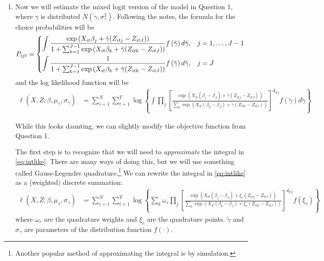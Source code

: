 \documentclass[12pt,english]{article}
\begin{document}
\begin{enumerate}
\item Now we will estimate the mixed logit version of the model in Question 1, where $\gamma$ is distributed $N\left(\tilde{\gamma},\sigma^2_{\gamma}\right)$. Following the notes, the  formula for the choice probabilities will be
    \begin{align*}
        P_{ijt} &= \begin{dcases} \int\frac{\exp\left(X_{it}\beta_j + \tilde{\gamma}(Z_{itj}-Z_{itJ})\right)}{1+\sum_{k=1}^{J-1}\exp\left(X_{it}\beta_k + \tilde{\gamma}(Z_{itk}-Z_{itJ})\right)}f\left(\tilde{\gamma}\right)d\tilde{\gamma} ,& j=1,\ldots,J-1\\
         \int\frac{1}{1+\sum_{k=1}^{J-1}\exp\left(X_{it}\beta_k + \tilde{\gamma}(Z_{itk}-Z_{itJ})\right)}f\left(\tilde{\gamma}\right)d\tilde{\gamma} ,& j=J
         \end{dcases}
    \end{align*}
and the log likelihood function will be
\begin{align}
\label{eq:intlike}
\ell\left(X,Z;\beta,\mu_{\gamma},\sigma_{\gamma}\right)&=\sum_{i=1}^N\sum_{t=1}^T \log\left\{\int\prod_{j}\left[\frac{\exp\left(X_{it}\left(\beta_{j}-\beta_{J}\right)+\tilde{\gamma}\left(Z_{itj}-Z_{itJ}\right)\right)}{\sum_k \exp\left(X_{it}\left(\beta_{k}-\beta_{J}\right)+\tilde{\gamma}\left(Z_{itk}-Z_{itJ}\right)\right)}\right]^{d_{itj}}f\left(\tilde{\gamma}\right)d\tilde{\gamma}\right\}
\end{align}

While this looks daunting, we can slightly modify the objective function from Question 1. 

The first step is to recognize that we will need to \textit{approximate} the integral in \eqref{eq:intlike}. There are many ways of doing this, but we will use something called Gauss-Legendre quadrature.\footnote{Another popular method of approximating the integral is by simulation.} We can rewrite the integral in \eqref{eq:intlike} as a (weighted) discrete summation:
\begin{align}
\label{eq:quadlike}
\ell\left(X,Z;\beta,\mu_{\gamma},\sigma_{\gamma}\right)&=\sum_{i=1}^N\sum_{t=1}^T \log\left\{\sum_{k}\omega_{r}\prod_{j}\left[\frac{\exp\left(X_{it}\left(\beta_{j}-\beta_{J}\right)+\xi_r\left(Z_{itj}-Z_{itJ}\right)\right)}{\sum_k \exp\left(X_{it}\left(\beta_{k}-\beta_{J}\right)+\xi_r\left(Z_{itk}-Z_{itJ}\right)\right)}\right]^{d_{itj}}f\left(\xi_r\right)\right\}
\end{align}
where $\omega_r$ are the quadrature weights and $\xi_r$ are the quadrature points. $\tilde{\gamma}$ and $\sigma_{\gamma}$ are parameters of the distribution function $f\left(\cdot\right)$.


\end{enumerate}
\end{document}
